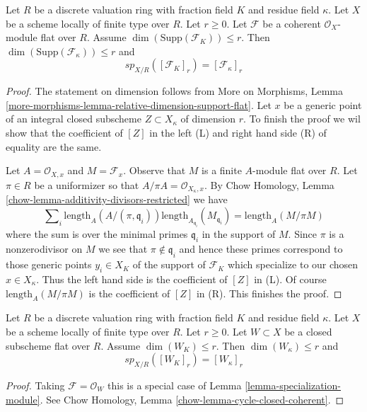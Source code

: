 \begin{lemma}
\label{lemma-specialization-module}
Let $R$ be a discrete valuation ring with fraction field $K$ and residue field
$\kappa$. Let $X$ be a scheme locally of finite type over $R$. Let $r \geq 0$.
Let $\mathcal{F}$ be a coherent $\mathcal{O}_X$-module flat over $R$. Assume
$\dim(\text{Supp}(\mathcal{F}_K)) \leq r$. Then
$\dim(\text{Supp}(\mathcal{F}_\kappa)) \leq r$ and
$$
sp_{X/R}([\mathcal{F}_K]_r) = [\mathcal{F}_\kappa]_r
$$
\end{lemma}

\begin{proof}
The statement on dimension follows from More on Morphisms, Lemma
\ref{more-morphisms-lemma-relative-dimension-support-flat}.
Let $x$ be a generic point of an integral closed subscheme
$Z \subset X_\kappa$ of dimension $r$. To finish the proof
we wil show that the coefficient of $[Z]$
in the left (L) and right hand side (R) of equality are the same.

\medskip\noindent
Let $A = \mathcal{O}_{X, x}$ and $M = \mathcal{F}_x$.
Observe that $M$ is a finite $A$-module flat over $R$.
Let $\pi \in R$ be a uniformizer so that
$A/\pi A = \mathcal{O}_{X_\kappa, x}$.
By Chow Homology, Lemma \ref{chow-lemma-additivity-divisors-restricted}
we have
$$
\sum\nolimits_i \text{length}_A(A/(\pi, \mathfrak q_i))
\text{length}_{A_{\mathfrak q_i}}(M_{\mathfrak q_i}) =
\text{length}_A(M/\pi M)
$$
where the sum is over the minimal primes
$\mathfrak q_i$ in the support of $M$.
Since $\pi$ is a nonzerodivisor on $M$ we see
that $\pi \not \in \mathfrak q_i$ and hence
these primes correspond to those generic points $y_i \in X_K$ of the
support of $\mathcal{F}_K$ which specialize to our chosen $x \in X_\kappa$.
Thus the left hand side is the coefficient of $[Z]$
in (L). Of course $\text{length}_A(M/\pi M)$ is the coefficient
of $[Z]$ in (R). This finishes the proof.
\end{proof}

\begin{lemma}
\label{lemma-specialization-closed}
Let $R$ be a discrete valuation ring with fraction field $K$ and residue field
$\kappa$. Let $X$ be a scheme locally of finite type over $R$. Let $r \geq 0$.
Let $W \subset X$ be a closed subscheme flat over $R$. Assume
$\dim(W_K) \leq r$. Then $\dim(W_\kappa) \leq r$ and
$$
sp_{X/R}([W_K]_r) = [W_\kappa]_r
$$
\end{lemma}

\begin{proof}
Taking $\mathcal{F} = \mathcal{O}_W$ this is a special case of
Lemma \ref{lemma-specialization-module}. See
Chow Homology, Lemma \ref{chow-lemma-cycle-closed-coherent}.
\end{proof}

